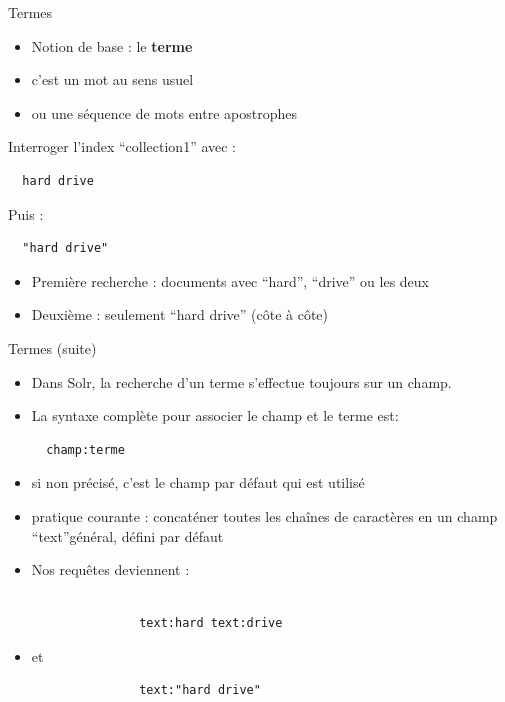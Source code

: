 \begin{frame}[fragile]{Termes}

  \begin{itemize}
    \item Notion de base : le {\bf terme}
    \item c'est un mot au sens usuel
    \item ou une séquence de mots entre apostrophes
  \end{itemize}
\smallskip
Interroger l'index ``collection1'' avec :
\begin{verbatim}
  hard drive
\end{verbatim}
Puis :
\begin{verbatim}
  "hard drive"
\end{verbatim}
\smallskip
\begin{itemize}
  \item Première recherche : documents avec ``hard'', ``drive'' ou les deux
  \item Deuxième : seulement ``hard drive'' (côte à côte)
\end{itemize}

\end{frame}

\begin{frame}[fragile]{Termes (suite)}
  \begin{itemize}
    \item Dans Solr, la recherche d'un terme s'effectue toujours sur un champ. 
\item La syntaxe complète pour associer le champ et le terme est:
\begin{verbatim}
  champ:terme
\end{verbatim}
\item si non précisé, c'est le champ par défaut qui est utilisé
\item pratique courante : concaténer toutes les chaînes de caractères en un
  champ ``text''général, défini par défaut
\item Nos requêtes deviennent :
\begin{verbatim}

               text:hard text:drive
\end{verbatim}
\item et 
\begin{verbatim}
               text:"hard drive"
\end{verbatim}
  \end{itemize}
\end{frame}

